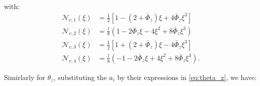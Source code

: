 \documentclass[a4paper,11pt]{article}
\begin{document}
with:
\begin{equation}
\begin{aligned}
	\mathcal{N}_{v,1}(\xi) & = \frac{1}{2} \left[1 - (2 + \bar{\Phi}_z)\xi + 4\bar{\Phi}_z\xi^3 \right] \\
	\mathcal{N}_{v,2}(\xi) & = \frac{l}{8}\left(1 - 2\bar{\Phi}_z\xi - 4\xi^2 + 8\bar{\Phi}_z\xi^3 \right) \\
	\mathcal{N}_{v,3}(\xi) & = \frac{1}{2} \left[1 + (2 + \bar{\Phi}_z)\xi - 4\bar{\Phi}_z\xi^3 \right] \\
	\mathcal{N}_{v,4}(\xi) & = \frac{l}{8}\left( -1 - 2\bar{\Phi}_z\xi + 4\xi^2 + 8\bar{\Phi}_z\xi^3 \right).
\end{aligned}
\end{equation}

\noindent Simirlarly for $\theta_z$, substituting the $a_i$ by their expressions in
\eqref{eq:theta_z}, we have:
\end{document}
